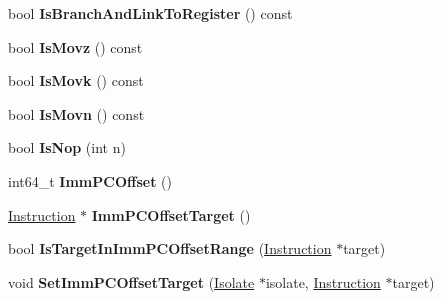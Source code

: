 \begin{DoxyCompactItemize}
\item 
bool {\bfseries Is\+Branch\+And\+Link\+To\+Register} () const \hypertarget{classv8_1_1internal_1_1_instruction_a2431db815433c3e102d28adcf8461e7b}{}\label{classv8_1_1internal_1_1_instruction_a2431db815433c3e102d28adcf8461e7b}

\item 
bool {\bfseries Is\+Movz} () const \hypertarget{classv8_1_1internal_1_1_instruction_af83688bfd2d1abea6eaf0f898745165e}{}\label{classv8_1_1internal_1_1_instruction_af83688bfd2d1abea6eaf0f898745165e}

\item 
bool {\bfseries Is\+Movk} () const \hypertarget{classv8_1_1internal_1_1_instruction_a2593d5d782f68bf6fbd69c44d1d0f0b1}{}\label{classv8_1_1internal_1_1_instruction_a2593d5d782f68bf6fbd69c44d1d0f0b1}

\item 
bool {\bfseries Is\+Movn} () const \hypertarget{classv8_1_1internal_1_1_instruction_a6b38a8d95639aad815125600e9523ddc}{}\label{classv8_1_1internal_1_1_instruction_a6b38a8d95639aad815125600e9523ddc}

\item 
bool {\bfseries Is\+Nop} (int n)\hypertarget{classv8_1_1internal_1_1_instruction_aedf8d12166333dd1f9349ecb75bb1d80}{}\label{classv8_1_1internal_1_1_instruction_aedf8d12166333dd1f9349ecb75bb1d80}

\item 
int64\+\_\+t {\bfseries Imm\+P\+C\+Offset} ()\hypertarget{classv8_1_1internal_1_1_instruction_ac03c28a2beead9a6485eda3a7be877df}{}\label{classv8_1_1internal_1_1_instruction_ac03c28a2beead9a6485eda3a7be877df}

\item 
\hyperlink{classv8_1_1internal_1_1_instruction}{Instruction} $\ast$ {\bfseries Imm\+P\+C\+Offset\+Target} ()\hypertarget{classv8_1_1internal_1_1_instruction_aa6970868d0bc53ee29bc74958465a9b8}{}\label{classv8_1_1internal_1_1_instruction_aa6970868d0bc53ee29bc74958465a9b8}

\item 
bool {\bfseries Is\+Target\+In\+Imm\+P\+C\+Offset\+Range} (\hyperlink{classv8_1_1internal_1_1_instruction}{Instruction} $\ast$target)\hypertarget{classv8_1_1internal_1_1_instruction_aa9f1e2021ca9a491f9ed61aa0f02138d}{}\label{classv8_1_1internal_1_1_instruction_aa9f1e2021ca9a491f9ed61aa0f02138d}

\item 
void {\bfseries Set\+Imm\+P\+C\+Offset\+Target} (\hyperlink{classv8_1_1internal_1_1_isolate}{Isolate} $\ast$isolate, \hyperlink{classv8_1_1internal_1_1_instruction}{Instruction} $\ast$target)\hypertarget{classv8_1_1internal_1_1_instruction_a5f9c746ad52dfb19425df05405fbdf98}{}\label{classv8_1_1internal_1_1_instruction_a5f9c746ad52dfb19425df05405fbdf98}


\end{DoxyCompactItemize}
